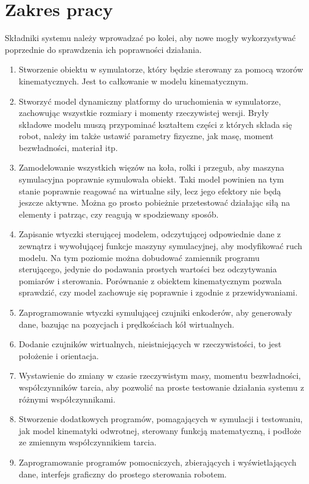 \section{Zakres pracy}
	Składniki systemu należy wprowadzać po kolei, aby nowe mogły wykorzystywać poprzednie do sprawdzenia ich poprawności działania.
	\begin{enumerate}
	\item Stworzenie obiektu w symulatorze, który będzie sterowany za pomocą wzorów kinematycznych. Jest to całkowanie w modelu kinematycznym.
	\item Stworzyć model dynamiczny platformy do uruchomienia w symulatorze, zachowując wszystkie rozmiary i momenty rzeczywistej wersji.
	Bryły składowe modelu muszą przypominać kształtem części z których składa się robot, należy im także ustawić parametry fizyczne, jak masę, moment bezwładności, materiał itp.
	\item Zamodelowanie wszystkich więzów na koła, rolki i przegub, aby maszyna symulacyjna poprawnie symulowała obiekt.
	Taki model powinien na tym stanie poprawnie reagować na wirtualne siły, lecz jego efektory nie będą jeszcze aktywne.
	Można go prosto pobieżnie przetestować działając siłą na elementy i patrząc, czy reagują w spodziewany sposób.
	\item Zapisanie wtyczki sterującej modelem, odczytującej odpowiednie dane z zewnątrz i wywołującej funkcje maszyny symulacyjnej, aby modyfikować ruch modelu.
	Na tym poziomie można dobudować zamiennik programu sterującego, jedynie do podawania prostych wartości bez odczytywania pomiarów i sterowania.
	Porównanie z obiektem kinematycznym pozwala sprawdzić, czy model zachowuje się poprawnie i zgodnie z przewidywaniami.
	\item Zaprogramowanie wtyczki symulującej czujniki enkoderów, aby generowały dane, bazując na pozycjach i prędkościach kół wirtualnych.
	\item Dodanie czujników wirtualnych, nieistniejących w rzeczywistości, to jest położenie i orientacja.
	\item Wystawienie do zmiany w czasie rzeczywistym masy, momentu bezwładności, współczynników tarcia, aby pozwolić na proste testowanie działania systemu z różnymi współczynnikami.
	\item Stworzenie dodatkowych programów, pomagających w symulacji i testowaniu, jak model kinematyki odwrotnej, sterowany funkcją matematyczną, i podłoże ze zmiennym współczynnikiem tarcia.
	\item Zaprogramowanie programów pomocniczych, zbierających i wyświetlających dane, interfejs graficzny do prostego sterowania robotem.

\end{enumerate}
